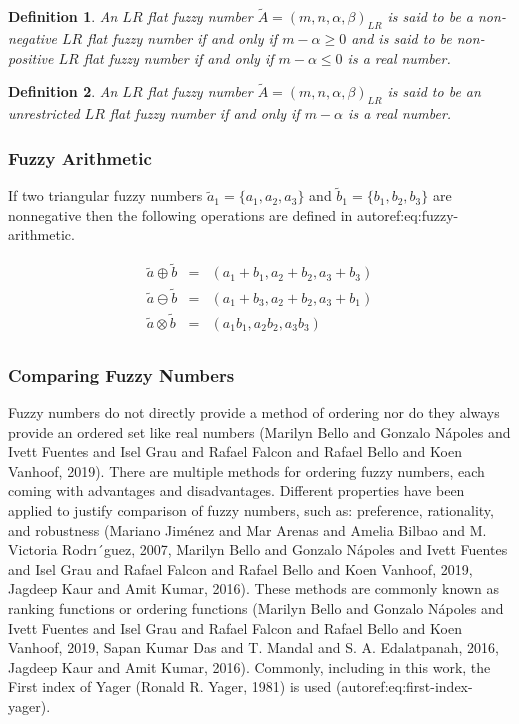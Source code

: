 \documentclass[11pt,a4paper,final]{article}
\newtheorem{definition}{Definition}[section]
\begin{document}
\begin{definition}
An \(LR\) flat fuzzy number \(\tilde{A} = (m,n,\alpha,\beta)_{LR}\) is said to be a non-negative \(LR\) flat fuzzy number if and only
if \(m-\alpha \ge 0\) and is said to be non-positive \(LR\) flat fuzzy number if and only if \(m - \alpha \le 0\) is a real number.
\end{definition}

\begin{definition}
An \(LR\) flat fuzzy number \(\tilde{A} = (m,n,\alpha,\beta)_{LR}\) is said to be an unrestricted \(LR\) flat fuzzy number if and only
if \(m - \alpha\) is a real number.
\end{definition}

\subsubsection{Fuzzy Arithmetic}
\label{sec:orgcfb0958}
If two triangular fuzzy numbers \(\tilde{a}_1 = \{a_1, a_2, a_3\}\) and \(\tilde{b}_1 = \{b_1, b_2, b_3\}\) are nonnegative
then the following operations are defined in autoref:eq:fuzzy-arithmetic.

\begin{equation}
\label{eq:fuzzy-arithmetic}
\begin{array}{lcl}
\tilde{a} \oplus \tilde{b} & = & (a_1 + b_1, a_2 + b_2, a_3 + b_3) \\
\tilde{a} \ominus \tilde{b} & = & (a_1 + b_3, a_2 + b_2, a_3 + b_1) \\
\tilde{a} \otimes \tilde{b} & = & (a_1 b_1, a_2 b_2, a_3 b_3)       \\
\end{array}
\end{equation}

\subsubsection{Comparing Fuzzy Numbers}
\label{sec:org425f88c}
Fuzzy numbers do not directly provide a method of ordering nor do they always provide an ordered set like real numbers
(Marilyn Bello and Gonzalo N{\'a}poles and Ivett Fuentes and Isel Grau and Rafael Falcon and Rafael Bello and Koen Vanhoof, 2019). There are multiple methods for ordering fuzzy numbers, each coming with advantages and
disadvantages. Different properties have been applied to justify comparison of fuzzy numbers, such as: preference,
rationality, and robustness (Mariano Jim{\'e}nez and Mar Arenas and Amelia Bilbao and M. Victoria Rodrı´guez, 2007, Marilyn Bello and Gonzalo N{\'a}poles and Ivett Fuentes and Isel Grau and Rafael Falcon and Rafael Bello and Koen Vanhoof, 2019, Jagdeep Kaur and Amit Kumar, 2016). These
methods are commonly known as ranking functions or ordering functions
(Marilyn Bello and Gonzalo N{\'a}poles and Ivett Fuentes and Isel Grau and Rafael Falcon and Rafael Bello and Koen Vanhoof, 2019, Sapan Kumar Das and T. Mandal and S. A. Edalatpanah, 2016, Jagdeep Kaur and Amit Kumar, 2016). Commonly, including in this work, the First
index of Yager (Ronald R. Yager, 1981) is used (autoref:eq:first-index-yager).
\end{document}
